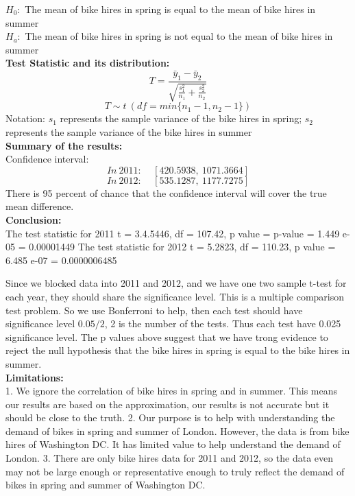 $H_0:$ The mean of bike hires in spring is equal to the mean of bike hires in summer\\
$H_a:$ The mean of bike hires in spring is not equal to the mean of bike hires in summer\\
\textbf{Test Statistic and its distribution:} ~\\
$$T = \frac{\bar{y}_1-\bar{y}_2}{\sqrt{\frac{s_1^2}{n_1}+\frac{s_2^2}{n_2}}}$$
$$T \sim t\ (df = min\{n_1-1,n_2-1\})$$
Notation: $s_1$ represents the sample variance of the bike hires in spring; $s_2$ represents the sample variance of the bike hires in summer\\
\textbf{Summary of the results:} ~\\
Confidence interval:
$$In\ 2011:\ \ \ \ \  [420.5938,\ 1071.3664]$$
$$In\ 2012:\ \ \ \ \  [535.1287,\ 1177.7275]$$
There is 95 percent of chance that the confidence interval will cover the true mean difference. \\
\textbf{Conclusion:} \\
The test statistic for 2011 t = 3.4.5446, df = 107.42, p value = p-value = 1.449 e-05 = 0.00001449
The test statistic for 2012 t = 5.2823, df = 110.23, p value = 6.485 e-07 = 0.0000006485

Since we blocked data into 2011 and 2012, and we have one two sample t-test for each year, they should share the significance level. This is a multiple comparison test problem. So we use Bonferroni to help, then each test should have significance level $0.05/2$, 2 is the number of the tests. Thus each test have 0.025 significance level. The p values above suggest that we have trong evidence to reject the null hypothesis that the bike hires in spring is equal to the bike hires in summer. \\
\textbf{Limitations:} ~\\
1. We ignore the correlation of bike hires in spring and in summer. This means our results are based on the approximation, our results is not accurate but it should be close to the truth.
2. Our purpose is to help with understanding the demand of bikes in spring and summer of London. However, the data is from bike hires of Washington DC. It has limited value to help understand the demand of London.
3. There are only bike hires data for 2011 and 2012, so the data even may not be large enough or representative enough to truly reflect the demand of bikes in spring and summer of Washington DC.



